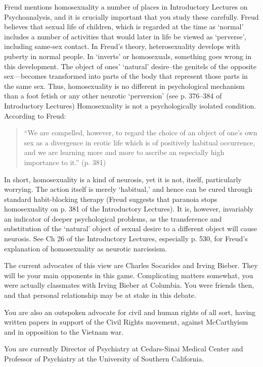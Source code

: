 \begin{refsection}
Freud mentions homosexuality a number of places in Introductory Lectures on Psychoanalysis, and it is crucially important that you study these carefully. Freud believes that sexual life of children, which is regarded at the time as `normal' includes a number of activities that would later in life be viewed as `perverse', including same-sex contact. In Freud's theory, heterosexuality develops with puberty in normal people. In `inverts' or homosexuals, something goes wrong in this development. The object of ones' `natural' desire--the genitels of the opposite sex—becomes transformed into parts of the body that represent those parts in the same sex. Thus, homosexuality is no different in psychological mechanism than a foot fetish or any other neurotic `perversion' (see p. 376--384 of Introductory Lectures) Homosexuality is not a psychologically isolated condition. According to Freud:

\begin{quote}

“We are compelled, however, to regard the choice of an object of one's own sex as a divergence in erotic life which is of positively habitual occurrence, and we are learning more and more to ascribe an especially high importance to it.” (p. 381)
\end{quote}

In short, homosexuality is a kind of neurosis, yet it is not, itself, particularly worrying. The action itself is merely `habitual,' and hence can be cured through standard habit-blocking therapy (Freud suggests that paranoia stops homosexuality on p. 381 of the Introductory Lectures). It is, however, invariably an indicator of deeper psychological problems, as the transference and substitution of the `natural' object of sexual desire to a different object will cause neurosis. See Ch 26 of the Introductory Lectures, especially p. 530, for Freud's explanation of homosexuality as neurotic narcissism.

The current advocates of this view are Charles Socarides and Irving Bieber. They will be your main opponents in this game. Complicating matters somewhat, you were actually classmates with Irving Bieber at Columbia. You were friends then, and that personal relationship may be at stake in this debate.

You are also an outspoken advocate for civil and human rights of all sort, having written papers in support of the Civil Rights movement, against McCarthyism and in opposition to the Vietnam war.

You are currently Director of Psychiatry at Cedars-Sinai Medical Center and Professor of Psychiatry at the University of Southern California.


\end{refsection}
